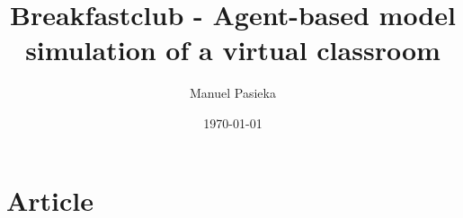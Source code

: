 \documentclass[11pt, a4paper, english]{book}
\title{Breakfastclub - Agent-based model simulation of a virtual classroom}
\author{Manuel Pasieka}
\date{\today}
\begin{document}
\renewcommand{\listfigurename}{Figures}
\renewcommand{\listtablename}{Tables}
\renewcommand{\contentsname}{Additional Content}
\renewcommand{\figurename}{Figura}
\renewcommand{\tablename}{Tabla} 

\newcommand{\bb}[1][5mm]{\vspace{#1}}

\newcommand{\note}[1]{
  \fboxsep0pt
  \colorbox{green}{\begin{minipage}{\textwidth}
      NOTE: #1
  \end{minipage}}  
}

\maketitle

\frontmatter

\tableofcontents
\listoffigures
\listoftables

\setlength{\parindent}{0pt}



\mainmatter















\chapter{Article}
 

 


\appendix


\end{document}
